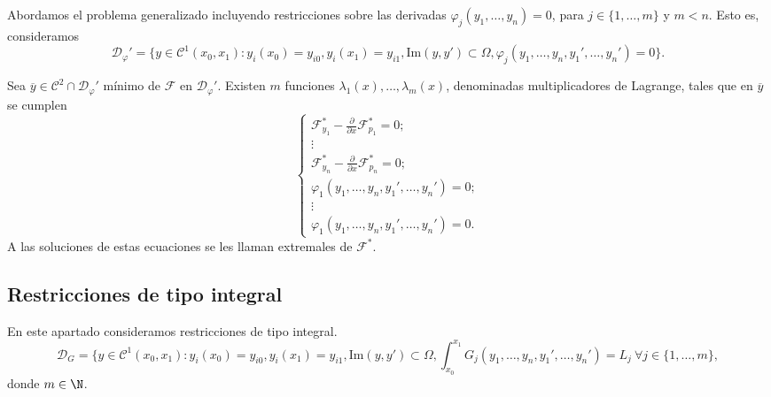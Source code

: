 \documentclass{article}
\begin{document}
Abordamos el problema generalizado incluyendo restricciones sobre las derivadas
$\varphi_j(y_1, \ldots, y_n) = 0$, para $j \in \{1, \ldots, m\}$ y $m < n$. Esto es, consideramos
\[\mathcal{D}_\varphi' = \{y \in \mathcal{C}^1(x_0, x_1): y_i(x_0) = y_{i0}, y_i(x_1) = y_{i1},
  \mathrm{Im}(y, y') \subset \Omega, \varphi_j(y_1, \ldots, y_n, y_1', \ldots, y_n') = 0 \}.\]

\begin{prop} \label{prop:ml:ad}
  Sea $\overline{y} \in \mathcal{C}^2 \cap \mathcal{D}_\varphi'$ mínimo de $\mathcal{F}$ en
  $\mathcal{D}_\varphi'$. Existen $m$ funciones $\lambda_1(x), \ldots, \lambda_m(x)$, denominadas
  multiplicadores de Lagrange, tales que en $\overline{y}$ se cumplen
  \[
    \begin{cases}
      \mathcal{F}_{y_1}^* - \frac{\partial}{\partial x} \mathcal{F}_{p_1}^* = 0; \\
      \vdots \\
      \mathcal{F}_{y_n}^* - \frac{\partial}{\partial x} \mathcal{F}_{p_n}^* = 0; \\
      \varphi_1(y_1, \dots, y_n, y_1', \ldots, y_n') = 0; \\
      \vdots \\
      \varphi_1(y_1, \dots, y_n, y_1', \ldots, y_n') = 0.
    \end{cases}
  \]
  A las soluciones de estas ecuaciones se les llaman extremales de $\mathcal{F}^*$.
\end{prop}

\subsection{Restricciones de tipo integral}

En este apartado consideramos restricciones de tipo integral.
\[\mathcal{D}_G = \{y \in \mathcal{C}^1(x_0, x_1): y_i(x_0) = y_{i0}, y_i(x_1) = y_{i1},
  \mathrm{Im}(y, y') \subset \Omega, \int_{x_0}^{x_1}G_j(y_1, \ldots, y_n, y_1', \ldots, y_n') = L_j
  \ \forall j \in \{1, \ldots, m\},\] donde $m \in \N$.
\end{document}
